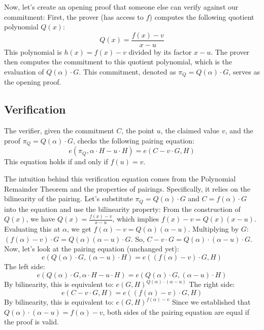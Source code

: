 Now, let's create an opening proof that someone else can verify against our commitment:
First, the prover (has access to $f$) computes the following quotient polynomial $Q(x)$:
$$ Q(x) = \frac{f(x) - v}{x - u} $$
This polynomial is $h(x)=f(x)-v$ divided by its factor $x-u$. 
The prover then computes the commitment to this quotient polynomial, which is the evaluation of $Q(\alpha)\cdot G$. This commitment, denoted as $\pi_Q = Q(\alpha)\cdot G$, serves as the opening proof.


\subsection{Verification}
The verifier, given the commitment $C$, the point $u$, the claimed value $v$, and the proof $\pi_Q = Q(\alpha)\cdot G$, checks the following pairing equation:
$$ e(\pi_Q, \alpha \cdot H - u \cdot H) =  e(C-v\cdot G,H)$$
This equation holds if and only if $f(u) = v$.

The intuition behind this verification equation comes from the Polynomial Remainder Theorem and the properties of pairings. Specifically, it relies on the bilinearity of the pairing.
Let's substitute $\pi_Q = Q(\alpha)\cdot G$ and $C=f(\alpha)\cdot G$ into the equation and use the bilinearity property:
From the construction of $Q(x)$, we have $Q(x) = \frac{f(x) - v}{x - u}$, which implies $f(x) - v = Q(x)(x-u)$.
Evaluating this at $\alpha$, we get $f(\alpha) - v = Q(\alpha)(\alpha-u)$.
Multiplying by $G$: $(f(\alpha) - v) \cdot G = Q(\alpha)(\alpha-u) \cdot G$.
So, $C - v \cdot G = Q(\alpha) \cdot (\alpha-u) \cdot G$.
Now, let's look at the pairing equation (unchanged yet):
$$ e(Q(\alpha)\cdot G, (\alpha-u) \cdot H) = e((f(\alpha)-v)\cdot G,H) $$
The left side:
$$ e(Q(\alpha)\cdot G, \alpha \cdot H - u \cdot H) = e(Q(\alpha)\cdot G, (\alpha-u) \cdot H) $$
By bilinearity, this is equivalent to:
$ e(G, H)^{Q(\alpha) \cdot (\alpha-u)} $
The right side:
$$ e(C - v \cdot G, H) = e((f(\alpha)-v)\cdot G, H) $$
By bilinearity, this is equivalent to:
$ e(G, H)^{f(\alpha)-v} $
Since we established that $Q(\alpha) \cdot (\alpha-u) = f(\alpha)-v$, both sides of the pairing equation are equal if the proof is valid.


